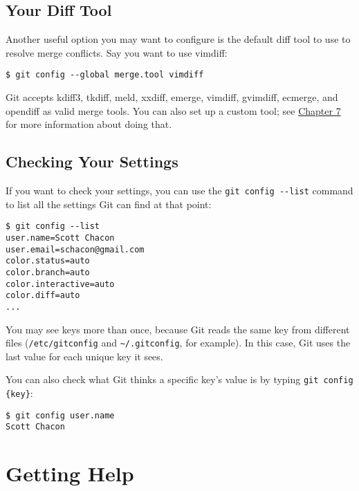 \documentclass[a4paper]{book}
\newcommand{\prechap}{Chapter }
\newcommand{\postchap}{}
\newcommand{\chapref}[1]{\hyperref[chap:#1]{\prechap #1\postchap}}
\begin{document}
\subsection{Your Diff Tool}

Another useful option you may want to configure is the default diff tool to use to resolve merge conflicts. Say you want to use vimdiff:

\begin{shaded}\begin{verbatim}
$ git config --global merge.tool vimdiff
\end{verbatim}\end{shaded}

Git accepts kdiff3, tkdiff, meld, xxdiff, emerge, vimdiff, gvimdiff, ecmerge, and opendiff as valid merge tools. You can also set up a custom tool; see \chapref{7} for more information about doing that.

\subsection{Checking Your Settings}

If you want to check your settings, you can use the \texttt{git config -{}-list} command to list all the settings Git can find at that point:

\begin{shaded}\begin{verbatim}
$ git config --list
user.name=Scott Chacon
user.email=schacon@gmail.com
color.status=auto
color.branch=auto
color.interactive=auto
color.diff=auto
...
\end{verbatim}\end{shaded}

You may see keys more than once, because Git reads the same key from different files (\texttt{/etc/gitconfig} and \texttt{\textasciitilde{}/.gitconfig}, for example). In this case, Git uses the last value for each unique key it sees.

You can also check what Git thinks a specific key's value is by typing \texttt{git config \{key\}}:

\begin{shaded}\begin{verbatim}
$ git config user.name
Scott Chacon
\end{verbatim}\end{shaded}

\section{Getting Help}
\end{document}
